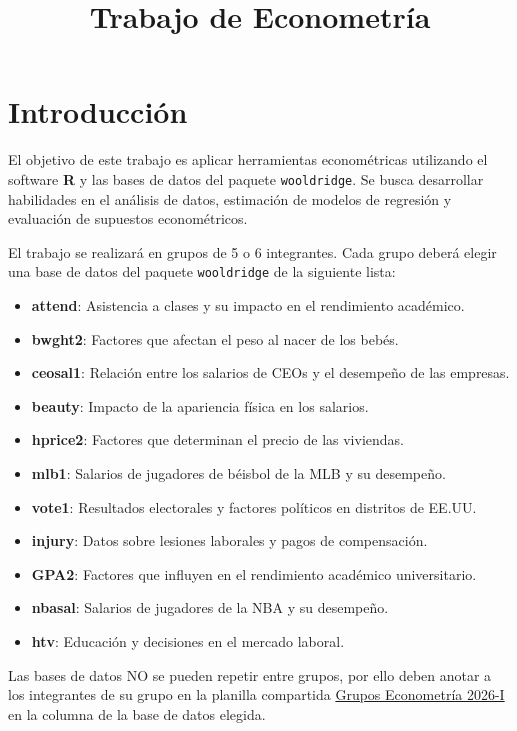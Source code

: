 \documentclass[a4paper,12pt]{article}
\title{Trabajo de Econometría}
\date{}
\begin{document}
\maketitle

\section{Introducción}

El objetivo de este trabajo es aplicar herramientas econométricas utilizando el software \textbf{R} y las bases de datos del paquete \texttt{wooldridge}. Se busca desarrollar habilidades en el análisis de datos, estimación de modelos de regresión y evaluación de supuestos econométricos.

El trabajo se realizará en grupos de 5 o 6 integrantes. Cada grupo deberá elegir una base de datos del paquete \texttt{wooldridge} de la siguiente lista:

\begin{itemize}
    \item \textbf{attend}: Asistencia a clases y su impacto en el rendimiento académico.
    \item \textbf{bwght2}: Factores que afectan el peso al nacer de los bebés.
    \item \textbf{ceosal1}: Relación entre los salarios de CEOs y el desempeño de las empresas.
    \item \textbf{beauty}: Impacto de la apariencia física en los salarios.
    \item \textbf{hprice2}: Factores que determinan el precio de las viviendas.
    \item \textbf{mlb1}: Salarios de jugadores de béisbol de la MLB y su desempeño.
    \item \textbf{vote1}: Resultados electorales y factores políticos en distritos de EE.UU.
    \item \textbf{injury}: Datos sobre lesiones laborales y pagos de compensación.
    \item \textbf{GPA2}: Factores que influyen en el rendimiento académico universitario.
    \item \textbf{nbasal}: Salarios de jugadores de la NBA y su desempeño.
    \item \textbf{htv}: Educación y decisiones en el mercado laboral.
\end{itemize}

Las bases de datos NO se pueden repetir entre grupos, por ello deben anotar a los integrantes de su grupo en la planilla compartida \href{https://docs.google.com/spreadsheets/d/1NI2CzwLY366fZft4j1RXH3JG4dCJMYc58QUd5BpT75A/edit?usp=sharing}{Grupos Econometría 2026-I} en la columna de la base de datos elegida.
\end{document}
